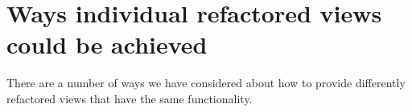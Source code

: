% 
% 


\section{Ways individual refactored views could be achieved}
There are a number of ways we have considered about how to provide differently refactored views that have the same functionality.

